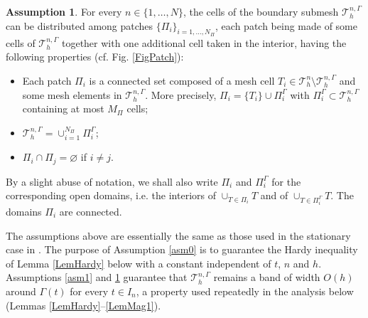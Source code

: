\documentclass[11pt,a4paper]{article}
\theoremstyle{plain}
\theoremstyle{definition}
\newtheorem{assumption}{Assumption}
\theoremstyle{remark}
\numberwithin{equation}{section}
\begin{document}
\begin{assumption}\label{asm2}
	For every $n\in\{1,\ldots,N\}$, the cells of the boundary submesh $\mathcal{T}_h^{n,\Gamma}$ can be {distributed among} patches $\{\Pi_i \}_{i = 1,\ldots, N_{\Pi}}$, {each patch being made of some cells of $\mathcal{T}_h^{n,\Gamma}$ together with one additional cell taken in the interior,} having the following properties (cf. Fig. \ref{FigPatch}):
	\begin{itemize}
		\item Each patch $\Pi_i$ is a connected set composed of a mesh cell $T_i\in\mathcal{T}_h^n\setminus\mathcal{T}_h^{n,\Gamma}$ and some mesh elements in $\mathcal{T}_h^{n,\Gamma}$. More precisely, $\Pi_i = \{T_i\} \cup \Pi_i^{\Gamma}$ with $\Pi_i^{\Gamma}{}\subset\mathcal{T}_h^{n,\Gamma}$ containing at most $M_\Pi$ cells;
		\item $\mathcal{T}_h^{n,\Gamma} = \cup_{i = 1}^{N_{\Pi}} \Pi_i^{\Gamma}$;
		\item $\Pi_i \cap \Pi_j = \varnothing$ if $i \neq j$.
	\end{itemize}
	By a slight abuse of notation, we shall also write $\Pi_i$ and $\Pi_i^\Gamma$ for the corresponding open domains, i.e. the interiors of $\cup_{T\in\Pi_i}T$ and of $\cup_{T\in\Pi_i^\Gamma}T$. The domains $\Pi_i$ are connected.
\end{assumption}


The assumptions above are essentially the same as those used in the stationary case in \cite{duprez2020phi}. The purpose of Assumption \ref{asm0} is to guarantee the Hardy inequality of Lemma \ref{LemHardy} below with a constant independent of $t$, $n$ and $h$.
Assumptions \ref{asm1} and \ref{asm2} guarantee that $\mathcal{T}_h^{n,\Gamma}$ remains a band of width $O(h)$ around $\Gamma(t)$ for every $t\in I_n$, a property used repeatedly in the analysis below (Lemmas \ref{LemHardy}--\ref{LemMag1}). 
\end{document}

